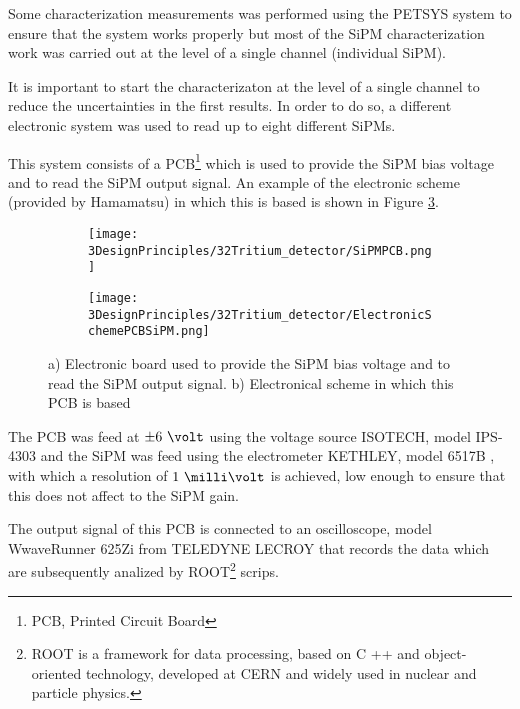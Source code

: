Some characterization measurements was performed using the PETSYS system to ensure that the system works properly but most of the SiPM characterization work was carried out at the level of a single channel (individual SiPM).

It is important to start the characterizaton at the level of a single channel to reduce the uncertainties in the first results. In order to do so, a different electronic system was used to read up to eight different SiPMs.

This system consists of a PCB\footnote{PCB, Printed Circuit Board} which is used to provide the SiPM bias voltage and to read the SiPM output signal. An example of the electronic scheme (provided by Hamamatsu) in which this is based is shown in Figure \ref{fig:PCBSiPM}.

\begin{figure}
\centering
    \begin{subfigure}[b]{0.5\textwidth}
    \centering
    \texttt{[image: 3DesignPrinciples/32Tritium\_detector/SiPMPCB.png]}  
    \caption{\label{subfig:ElectronicBoardSiPM}}
    \end{subfigure}
    \hfill
    \begin{subfigure}[b]{0.45\textwidth}
    \centering
    \texttt{[image: 3DesignPrinciples/32Tritium\_detector/ElectronicSchemePCBSiPM.png]}  
    \caption{\label{subfig:ElectronicSchemePCBSiPM}}
    \end{subfigure}
    \hfill
 \caption{a) Electronic board used to provide the SiPM bias voltage and to read the SiPM output signal. b) Electronical scheme in which this PCB is based}
 \label{fig:PCBSiPM}
\end{figure}

The PCB was feed at $\pm6~\volt$ using the voltage source ISOTECH, model IPS-4303 \cite{VoltageSourceISOTECH} and the SiPM was feed using the electrometer KETHLEY, model 6517B \cite{VoltageSourceKethley}, with which a resolution of $1~\milli\volt$ is achieved, low enough to ensure that this does not affect to the SiPM gain.

The output signal of this PCB is connected to an oscilloscope, model WwaveRunner 625Zi from TELEDYNE LECROY \cite{OscilloscopeIFIMED} that records the data which are subsequently analized by ROOT\footnote{ROOT is a framework for data processing, based on C ++ and object-oriented technology, developed at CERN and widely used in nuclear and particle physics.} scrips.